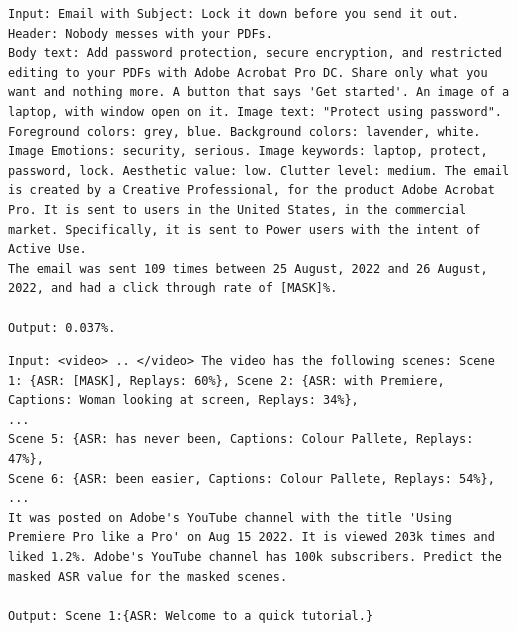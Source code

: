 \begin{lstlisting}[caption={Verbalization pattern of emails for the behavior domain adapation task. The email content and CTR is for demonstration purposes only.},frame=single,label={listing-email-content-behavior-simulation},basicstyle=\scriptsize]
Input: Email with Subject: Lock it down before you send it out. 
Header: Nobody messes with your PDFs. 
Body text: Add password protection, secure encryption, and restricted editing to your PDFs with Adobe Acrobat Pro DC. Share only what you want and nothing more. A button that says 'Get started'. An image of a laptop, with window open on it. Image text: "Protect using password". 
Foreground colors: grey, blue. Background colors: lavender, white. Image Emotions: security, serious. Image keywords: laptop, protect, password, lock. Aesthetic value: low. Clutter level: medium. The email is created by a Creative Professional, for the product Adobe Acrobat Pro. It is sent to users in the United States, in the commercial market. Specifically, it is sent to Power users with the intent of Active Use.
The email was sent 109 times between 25 August, 2022 and 26 August, 2022, and had a click through rate of [MASK]%.

Output: 0.037%.
\end{lstlisting}



\begin{lstlisting}[caption={Verbalization pattern to teach behavior in the reverse direction (predicting content given behavior):},frame=single,label={listing-content-simulation-verbalization},basicstyle=\scriptsize]
Input: <video> .. </video> The video has the following scenes: Scene 1: {ASR: [MASK], Replays: 60%}, Scene 2: {ASR: with Premiere, Captions: Woman looking at screen, Replays: 34%},
...
Scene 5: {ASR: has never been, Captions: Colour Pallete, Replays: 47%},
Scene 6: {ASR: been easier, Captions: Colour Pallete, Replays: 54%},
...
It was posted on Adobe's YouTube channel with the title 'Using Premiere Pro like a Pro' on Aug 15 2022. It is viewed 203k times and liked 1.2%. Adobe's YouTube channel has 100k subscribers. Predict the masked ASR value for the masked scenes.

Output: Scene 1:{ASR: Welcome to a quick tutorial.}
\end{lstlisting}



